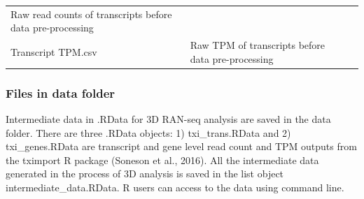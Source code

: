 \documentclass[]{article}
\begin{document}
\begin{longtable}[]{@{}lll@{}}
\begin{minipage}[t]{0.65\columnwidth}
Raw read counts of transcripts before data pre-processing\strut
\end{minipage} & \begin{minipage}[t]{0.02\columnwidth}\raggedright\strut
\strut
\end{minipage}\tabularnewline
\begin{minipage}[t]{0.25\columnwidth}\raggedright\strut
Transcript TPM.csv\strut
\end{minipage} & \begin{minipage}[t]{0.65\columnwidth}\raggedright\strut
Raw TPM of transcripts before data pre-processing\strut
\end{minipage} & \begin{minipage}[t]{0.02\columnwidth}\raggedright\strut
\strut
\end{minipage}\tabularnewline
\bottomrule
\end{longtable}

\subsubsection{Files in data folder}\label{files-in-data-folder}

Intermediate data in .RData for 3D RAN-seq analysis are saved in the
data folder. There are three .RData objects: 1) txi\_trans.RData and 2)
txi\_genes.RData are transcript and gene level read count and TPM
outputs from the tximport R package (Soneson et al., 2016). All the
intermediate data generated in the process of 3D analysis is saved in
the list object intermediate\_data.RData. R users can access to the data
using command line.
\end{document}
